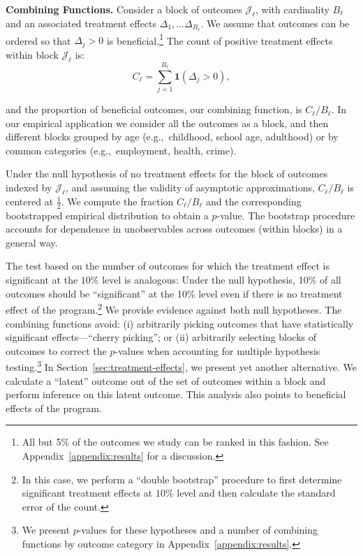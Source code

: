 \textbf{Combining Functions.} Consider a block of outcomes $\mathcal{J}_{\ell}$, with cardinality $B_{\ell}$ and an associated treatment effects $\Delta_1, \ldots \Delta_{B_\ell}$. We assume that outcomes can be ordered so that $\Delta_{j} >0$ is beneficial.\footnote{All but 5\% of the outcomes we study can be ranked in this fashion. See Appendix~\ref{appendix:results} for a discussion.} The count of positive treatment effects within block $\mathcal{J}_{\ell}$ is:
\begin{equation}
C_\ell = \sum^{B_\ell}_{j=1} \bm{1} (\Delta_{j} >0), 
\end{equation}

\noindent and the proportion of beneficial outcomes, our combining function, is $C_\ell / B_\ell$. In our empirical application we consider all the outcomes as a block, and then different blocks grouped by age (e.g.,\ childhood, school age, adulthood) or by common categories (e.g.,\ employment, health, crime).

Under the null hypothesis of no treatment effects for the block of outcomes indexed by $\mathcal{J}_\ell$, and assuming the validity of asymptotic approximations, $C_\ell / B_\ell$ is centered at $\frac{1}{2}$. We compute the fraction $C_\ell / B_\ell$ and the corresponding bootstrapped empirical distribution to obtain a $p$-value. The bootstrap procedure accounts for dependence in unobservables across outcomes (within blocks) in a general way. 

The test based on the number of outcomes for which the treatment effect is significant at the $10\%$ level is analogous: Under the null hypothesis, 10\% of all outcomes should be ``significant'' at the 10\% level even if there is no treatment effect of the program.\footnote{In this case, we perform a ``double bootstrap'' procedure to first determine significant treatment effects at $10\%$ level and then calculate the standard error of the count.} We provide evidence against both null hypotheses. The combining functions avoid: (i) arbitrarily picking outcomes that have statistically significant effects---``cherry picking''; or (ii) arbitrarily selecting blocks of outcomes to correct the $p$-values when accounting for multiple hypothesis testing.\footnote{We present $p$-values for these hypotheses and a number of combining functions by outcome category in Appendix~\ref{appendix:results}.} In Section~\ref{sec:treatment-effects}, we present yet another alternative. We calculate a ``latent'' outcome out of the set of outcomes within a block and perform inference on this latent outcome. This analysis also points to beneficial effects of the program.

